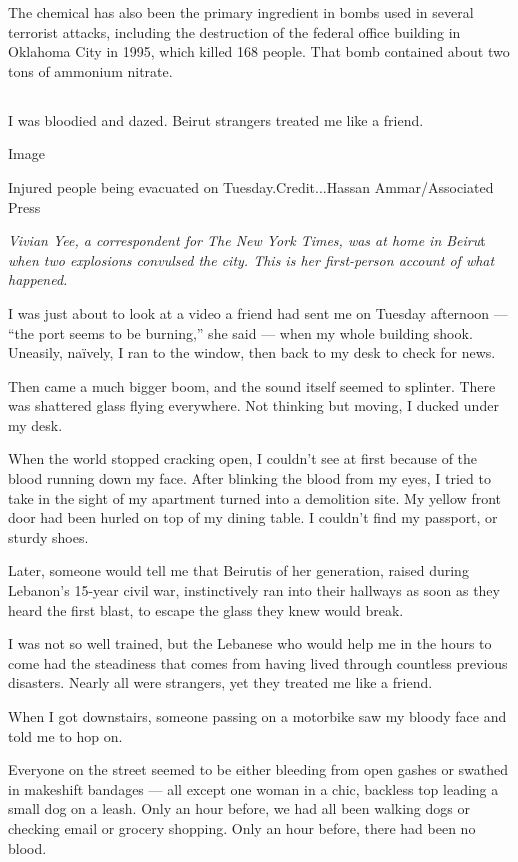 The chemical has also been the primary ingredient in bombs used in
several terrorist attacks, including the destruction of the federal
office building in Oklahoma City in 1995, which killed 168 people. That
bomb contained about two tons of ammonium nitrate.

\hypertarget{-3}{%
\subsection{}\label{-3}}

I was bloodied and dazed. Beirut strangers treated me like a friend.

Image

Injured people being evacuated on Tuesday.Credit...Hassan
Ammar/Associated Press

\emph{Vivian Yee, a correspondent for The New York Times, was at home in
Beiru}t \emph{when two explosions convulsed the city. This is her
first-person account of what happened.}

I was just about to look at a video a friend had sent me on Tuesday
afternoon --- ``the port seems to be burning,'' she said --- when my
whole building shook. Uneasily, naïvely, I ran to the window, then back
to my desk to check for news.

Then came a much bigger boom, and the sound itself seemed to splinter.
There was shattered glass flying everywhere. Not thinking but moving, I
ducked under my desk.

When the world stopped cracking open, I couldn't see at first because of
the blood running down my face. After blinking the blood from my eyes, I
tried to take in the sight of my apartment turned into a demolition
site. My yellow front door had been hurled on top of my dining table. I
couldn't find my passport, or sturdy shoes.

Later, someone would tell me that Beirutis of her generation, raised
during Lebanon's 15-year civil war, instinctively ran into their
hallways as soon as they heard the first blast, to escape the glass they
knew would break.

I was not so well trained, but the Lebanese who would help me in the
hours to come had the steadiness that comes from having lived through
countless previous disasters. Nearly all were strangers, yet they
treated me like a friend.

When I got downstairs, someone passing on a motorbike saw my bloody face
and told me to hop on.

Everyone on the street seemed to be either bleeding from open gashes or
swathed in makeshift bandages --- all except one woman in a chic,
backless top leading a small dog on a leash. Only an hour before, we had
all been walking dogs or checking email or grocery shopping. Only an
hour before, there had been no blood.

